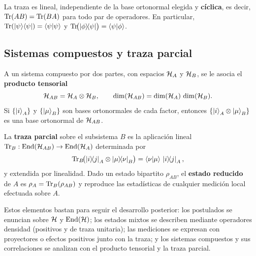 \documentclass[../main.tex]{subfiles}
\begin{document}
\begin{proposicion}
La traza es lineal, independiente de la base ortonormal elegida y \textbf{cíclica}, es decir, $\Tr(AB)=\Tr(BA)$ para todo par de operadores. En particular, $\Tr(\ket{\psi}\!\bra{\psi})=\braket{\psi|\psi}$ y $\Tr\!\bigl(\ketbra{\phi}{\psi}\bigr)=\braket{\psi|\phi}$.
\end{proposicion}

\subsection*{Sistemas compuestos y traza parcial}

\begin{definicion}
A un sistema compuesto por dos partes, con espacios $\mathcal{H}_A$ y $\mathcal{H}_B$, se le asocia el \textbf{producto tensorial}
\begin{equation*}
    \mathcal{H}_{AB}=\mathcal{H}_A\otimes\mathcal{H}_B,
    \qquad
    \dim(\mathcal{H}_{AB})=\dim(\mathcal{H}_A)\,\dim(\mathcal{H}_B).
\end{equation*}
Si $\{\ket{i}_A\}$ y $\{\ket{\mu}_B\}$ son bases ortonormales de cada factor, entonces $\{\ket{i}_A\otimes\ket{\mu}_B\}$ es una base ortonormal de $\mathcal{H}_{AB}$.
\end{definicion}

\begin{definicion}
La \textbf{traza parcial} sobre el subsistema $B$ es la aplicación lineal $\Tr_B:\operatorname{End}(\mathcal{H}_{AB})\to\operatorname{End}(\mathcal{H}_A)$ determinada por
\begin{equation*}
    \Tr_B\!\bigl(\ketbra{i}{j}_A\otimes\ketbra{\mu}{\nu}_B\bigr)
    =\braket{\nu|\mu}\,\ketbra{i}{j}_A,
\end{equation*}
y extendida por linealidad. Dado un estado bipartito $\rho_{AB}$, el \textbf{estado reducido} de $A$ es $\rho_A=\Tr_B(\rho_{AB})$ y reproduce las estadísticas de cualquier medición local efectuada sobre $A$.
\end{definicion}

\begin{observacion}
Estos elementos bastan para seguir el desarrollo posterior: los postulados se enuncian sobre $\mathcal{H}$ y $\operatorname{End}(\mathcal{H})$; los estados mixtos se describen mediante operadores densidad (positivos y de traza unitaria); las mediciones se expresan con proyectores o efectos positivos junto con la traza; y los sistemas compuestos y sus correlaciones se analizan con el producto tensorial y la traza parcial.
\end{observacion}

\newpage
\end{document}
